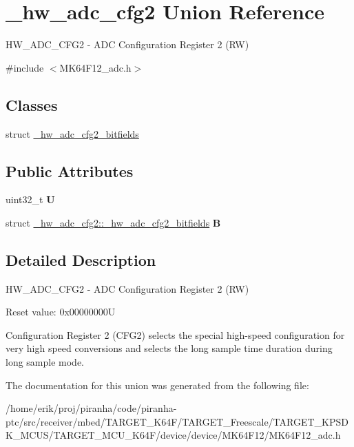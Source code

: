 \hypertarget{union__hw__adc__cfg2}{}\section{\+\_\+hw\+\_\+adc\+\_\+cfg2 Union Reference}
\label{union__hw__adc__cfg2}


H\+W\+\_\+\+A\+D\+C\+\_\+\+C\+F\+G2 -\/ A\+DC Configuration Register 2 (RW)  




{\ttfamily \#include $<$M\+K64\+F12\+\_\+adc.\+h$>$}

\subsection*{Classes}
\begin{DoxyCompactItemize}
\item 
struct \hyperlink{struct__hw__adc__cfg2_1_1__hw__adc__cfg2__bitfields}{\+\_\+hw\+\_\+adc\+\_\+cfg2\+\_\+bitfields}
\end{DoxyCompactItemize}
\subsection*{Public Attributes}
\begin{DoxyCompactItemize}
\item 
uint32\+\_\+t {\bfseries U}\hypertarget{union__hw__adc__cfg2_adf703bf58759747e14505242a5390214}{}\label{union__hw__adc__cfg2_adf703bf58759747e14505242a5390214}

\item 
struct \hyperlink{struct__hw__adc__cfg2_1_1__hw__adc__cfg2__bitfields}{\+\_\+hw\+\_\+adc\+\_\+cfg2\+::\+\_\+hw\+\_\+adc\+\_\+cfg2\+\_\+bitfields} {\bfseries B}\hypertarget{union__hw__adc__cfg2_acc3a65c15bdc87e49978a9f0dcac5a61}{}\label{union__hw__adc__cfg2_acc3a65c15bdc87e49978a9f0dcac5a61}

\end{DoxyCompactItemize}


\subsection{Detailed Description}
H\+W\+\_\+\+A\+D\+C\+\_\+\+C\+F\+G2 -\/ A\+DC Configuration Register 2 (RW) 

Reset value\+: 0x00000000U

Configuration Register 2 (C\+F\+G2) selects the special high-\/speed configuration for very high speed conversions and selects the long sample time duration during long sample mode. 

The documentation for this union was generated from the following file\+:\begin{DoxyCompactItemize}
\item 
/home/erik/proj/piranha/code/piranha-\/ptc/src/receiver/mbed/\+T\+A\+R\+G\+E\+T\+\_\+\+K64\+F/\+T\+A\+R\+G\+E\+T\+\_\+\+Freescale/\+T\+A\+R\+G\+E\+T\+\_\+\+K\+P\+S\+D\+K\+\_\+\+M\+C\+U\+S/\+T\+A\+R\+G\+E\+T\+\_\+\+M\+C\+U\+\_\+\+K64\+F/device/device/\+M\+K64\+F12/M\+K64\+F12\+\_\+adc.\+h\end{DoxyCompactItemize}
